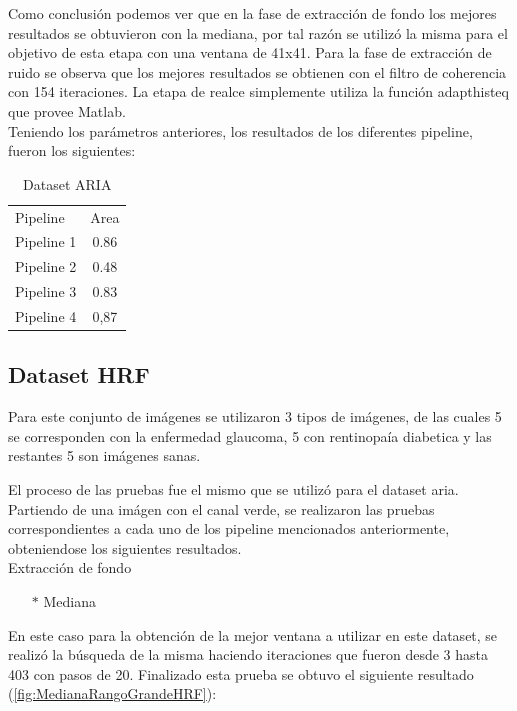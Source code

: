 Como conclusi\'on podemos ver que en la fase de extracci\'on de fondo los mejores resultados se obtuvieron con la mediana, por tal raz\'on se utiliz\'o la misma para el objetivo de esta etapa con una ventana de 41x41. Para la fase de extracci\'on de ruido se observa que los mejores resultados se obtienen con el filtro de coherencia con 154 iteraciones. La etapa de realce simplemente utiliza la funci\'on adapthisteq que provee Matlab.\\

Teniendo los par\'ametros  anteriores, los resultados de los diferentes pipeline, fueron los siguientes:\\


\begin{table}[!ht]
  \begin{center}
    \begin{tabular}{| l c |}
    \hline
    Pipeline &   Area \\
    Pipeline 1 & 0.86\\
    Pipeline 2 & 0.48\\
    Pipeline 3 & 0.83\\
    Pipeline 4 & 0,87\\
    \hline
    \end{tabular}
  \end{center}
  \caption{Dataset ARIA}
\end{table}



\subsection{Dataset HRF}

Para este conjunto de im\'agenes se utilizaron 3 tipos de im\'agenes, de las cuales 5 se corresponden con la enfermedad glaucoma, 5 con rentinopa\'ia diabetica y las restantes 5 son im\'agenes sanas. 

El proceso de las pruebas fue el mismo que se utiliz\'o para el dataset aria. Partiendo de una im\'agen con el canal verde, se realizaron las pruebas correspondientes a cada uno de los pipeline mencionados anteriormente, obteniendose los siguientes resultados.\\

Extracción de fondo
\begin{itemize}
	\item[$*$]Mediana 
\end{itemize}

En este caso para la obtenci\'on de la mejor ventana a utilizar en este dataset, se realiz\'o la b\'usqueda de la misma haciendo iteraciones que fueron desde 3 hasta 403 con pasos de 20. Finalizado esta prueba se obtuvo el siguiente resultado (\ref{fig:MedianaRangoGrandeHRF}): 

